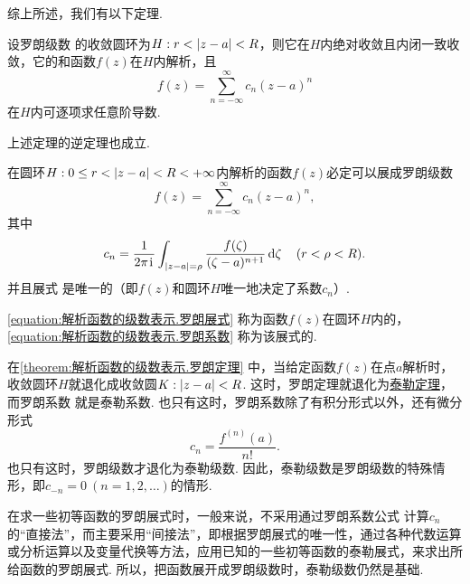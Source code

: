 综上所述，我们有以下定理.
\begin{theorem}
设罗朗级数  的收敛圆环为\(H: r < \abs{z-a} < R\)，则它在\(H\)内绝对收敛且内闭一致收敛，它的和函数\(f(z)\)在\(H\)内解析，且\[
f(z) = \sum\limits_{n=-\infty}^\infty c_n (z-a)^n
\]在\(H\)内可逐项求任意阶导数.
\end{theorem}

上述定理的逆定理也成立.
\begin{theorem}[罗朗定理]\label{theorem:解析函数的级数表示.罗朗定理}
在圆环\(H: 0 \leq r < \abs{z-a} < R < +\infty\)内解析的函数\(f(z)\)必定可以展成罗朗级数\begin{equation}\label{equation:解析函数的级数表示.罗朗展式}
f(z) = \sum\limits_{n=-\infty}^\infty c_n (z-a)^n,
\end{equation}其中\begin{equation}\label{equation:解析函数的级数表示.罗朗系数}
c_n = \frac{1}{2\pi\kern1pt\mathrm{i}\kern1pt} \int_{\abs{z-a}=\rho} \frac{f(\zeta)}{(\zeta-a)^{n+1}} \dd{\zeta}
\quad(r<\rho<R).
\end{equation}
并且展式  是唯一的（即\(f(z)\)和圆环\(H\)唯一地决定了系数\(c_n\)）.
\end{theorem}
\cref{equation:解析函数的级数表示.罗朗展式} 称为函数\(f(z)\)在圆环\(H\)内的，\cref{equation:解析函数的级数表示.罗朗系数} 称为该展式的.

在\cref{theorem:解析函数的级数表示.罗朗定理} 中，当给定函数\(f(z)\)在点\(a\)解析时，收敛圆环\(H\)就退化成收敛圆\(K: \abs{z-a}<R\).
这时，罗朗定理就退化为\hyperref[theorem:解析函数的级数表示.泰勒定理]{泰勒定理}，而罗朗系数  就是泰勒系数.
也只有这时，罗朗系数除了有积分形式以外，还有微分形式\[
c_n = \frac{f^{(n)}(a)}{n!}.
\]也只有这时，罗朗级数才退化为泰勒级数.
因此，泰勒级数是罗朗级数的特殊情形，即\(c_{-n} = 0\ (n=1,2,\dotsc)\)的情形.

在求一些初等函数的罗朗展式时，一般来说，不采用通过罗朗系数公式  计算\(c_n\)的“直接法”，而主要采用“间接法”，即根据罗朗展式的唯一性，通过各种代数运算或分析运算以及变量代换等方法，应用已知的一些初等函数的泰勒展式，来求出所给函数的罗朗展式.
所以，把函数展开成罗朗级数时，泰勒级数仍然是基础.

